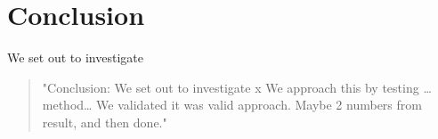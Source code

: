 \section{Conclusion}
\researchQuestion
We set out to investigate 
\begin{quote}
    "Conclusion: We set out to investigate x
    We approach this by testing … method…
    We validated it was valid approach. 
    Maybe 2 numbers from result, and then done."
\end{quote}
